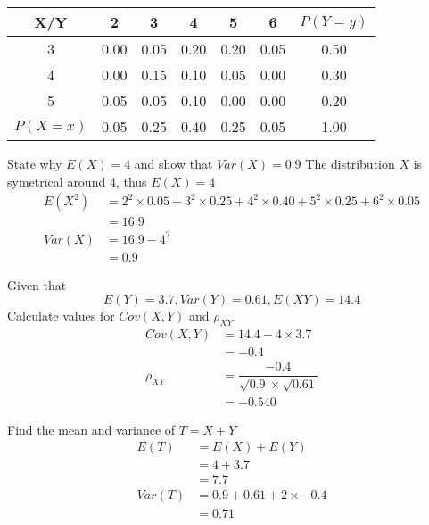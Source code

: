         \begin{example}
        {
            \begin{center}
                \begin{tabular}{c|c|c|c|c|c|c}
                    X/Y & 2 & 3 & 4 & 5 & 6 & $P(Y = y)$\\
                    \hline
                    3 & 0.00 & 0.05 & 0.20 & 0.20 & 0.05 & 0.50 \\
                    4 & 0.00 & 0.15 & 0.10 & 0.05 & 0.00 & 0.30 \\
                    5 & 0.05 & 0.05 & 0.10 & 0.00 & 0.00 & 0.20 \\
                    \hline
                    $P(X = x)$ & 0.05 & 0.25 & 0.40 & 0.25 & 0.05 & 1.00 \\
                \end{tabular}
            \end{center}
        }

            \begin{step}{State why $E(X)=4$ and show that $Var(X)=0.9$}
                The distribution $X$ is symetrical around 4, thus $E(X) = 4$
                \begin{align*}
                    E(X^2) &= 2^2 \times 0.05 + 3^2 \times 0.25 + 4^2 \times 0.40 + 5^2 \times 0.25 + 6^2 \times 0.05\\
                    &= 16.9 \\
                    Var(X) &= 16.9 - 4^2 \\
                    &= 0.9
                \end{align*}
            \end{step}

            \begin{step}{Given that $$E(Y)=3.7,Var(Y)=0.61,E(XY)=14.4$$Calculate values for $Cov(X,Y)$ and $\rho_{XY}$}
                \begin{align*}
                Cov(X,Y)  &= 14.4 - 4 \times 3.7                            \\
                        &= -0.4                                           \\
                \rho_{XY} &= \dfrac{-0.4}{\sqrt{0.9} \times \sqrt{0.61}}    \\
                        &= -0.540
                \end{align*}
            \end{step}

            \begin{step}{Find the mean and variance of $T = X + Y$}
                \begin{align*}
                    E(T)    &= E(X) + E(Y)                  \\
                            &= 4 + 3.7                      \\
                            &= 7.7                          \\
                    Var(T)  &= 0.9 + 0.61 + 2 \times -0.4   \\
                            &= 0.71
                \end{align*}
            \end{step}


\end{example}

